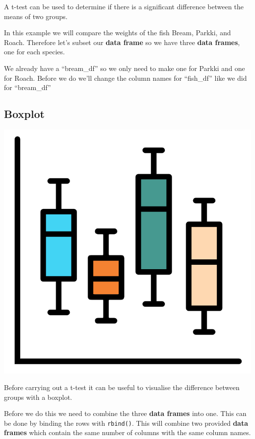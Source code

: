 \documentclass[]{book}
\newenvironment{Shaded}{\begin{snugshade}}{\end{snugshade}}
\newcommand{\KeywordTok}[1]{\textcolor[rgb]{0.13,0.29,0.53}{\textbf{#1}}}
\newcommand{\DecValTok}[1]{\textcolor[rgb]{0.00,0.00,0.81}{#1}}
\newcommand{\StringTok}[1]{\textcolor[rgb]{0.31,0.60,0.02}{#1}}
\newcommand{\OperatorTok}[1]{\textcolor[rgb]{0.81,0.36,0.00}{\textbf{#1}}}
\newcommand{\NormalTok}[1]{#1}
\begin{document}
A t-test can be used to determine if there is a significant difference
between the means of two groups.

In this example we will compare the weights of the fish Bream, Parkki,
and Roach. Therefore let's subset our \textbf{data frame} so we have
three \textbf{data frames}, one for each species.

We already have a ``bream\_df'' so we only need to make one for Parkki
and one for Roach. Before we do we'll change the column names for
``fish\_df'' like we did for ``bream\_df''

\begin{Shaded}
\end{Shaded}

\subsection{Boxplot}\label{boxplot}

\begin{center}\includegraphics[width=0.2\linewidth]{figures/boxplot} \end{center}

Before carrying out a t-test it can be useful to visualise the
difference between groups with a boxplot.

Before we do this we need to combine the three \textbf{data frames} into
one. This can be done by binding the rows with \texttt{rbind()}. This
will combine two provided \textbf{data frames} which contain the same
number of columns with the same column names.
\end{document}
